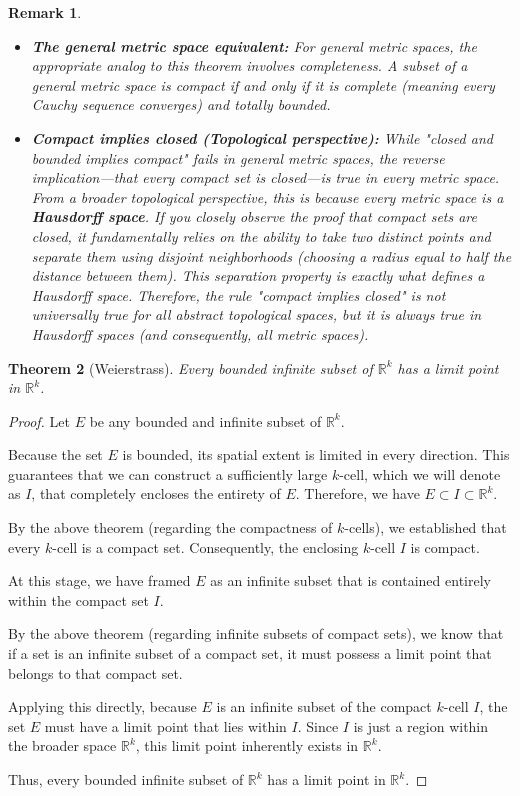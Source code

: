 \documentclass{article}
\theoremstyle{mythm}
\newtheorem{theorem}{Theorem}[section]
\newtheorem{remark}[theorem]{Remark}
\begin{document}
\begin{remark}
\begin{itemize}
    \item \textbf{The general metric space equivalent:} 
    For general metric spaces, the appropriate analog to this theorem involves completeness. A subset of a general metric space is compact if and only if it is \textit{complete} (meaning every Cauchy sequence converges) and \textit{totally bounded}.
    
    \item \textbf{Compact implies closed (Topological perspective):} 
    While "closed and bounded implies compact" fails in general metric spaces, the reverse implication—that \textit{every compact set is closed}—is true in every metric space. 
    From a broader topological perspective, this is because every metric space is a \textbf{Hausdorff space}. If you closely observe the proof that compact sets are closed, it fundamentally relies on the ability to take two distinct points and separate them using disjoint neighborhoods (choosing a radius equal to half the distance between them). This separation property is exactly what defines a Hausdorff space. 
    Therefore, the rule "compact implies closed" is not universally true for all abstract topological spaces, but it is always true in Hausdorff spaces (and consequently, all metric spaces).
\end{itemize}
\end{remark}
\begin{theorem}[Weierstrass]
Every bounded infinite subset of $\mathbb{R}^k$ has a limit point in $\mathbb{R}^k$.
\end{theorem}

\begin{proof}
Let $E$ be any bounded and infinite subset of $\mathbb{R}^k$. 

Because the set $E$ is bounded, its spatial extent is limited in every direction. This guarantees that we can construct a sufficiently large $k$-cell, which we will denote as $I$, that completely encloses the entirety of $E$. Therefore, we have $E \subset I \subset \mathbb{R}^k$.

By the above theorem (regarding the compactness of $k$-cells), we established that every $k$-cell is a compact set. Consequently, the enclosing $k$-cell $I$ is compact.

At this stage, we have framed $E$ as an infinite subset that is contained entirely within the compact set $I$. 

By the above theorem (regarding infinite subsets of compact sets), we know that if a set is an infinite subset of a compact set, it must possess a limit point that belongs to that compact set. 

Applying this directly, because $E$ is an infinite subset of the compact $k$-cell $I$, the set $E$ must have a limit point that lies within $I$. Since $I$ is just a region within the broader space $\mathbb{R}^k$, this limit point inherently exists in $\mathbb{R}^k$. 

Thus, every bounded infinite subset of $\mathbb{R}^k$ has a limit point in $\mathbb{R}^k$.
\end{proof}
\end{document}
